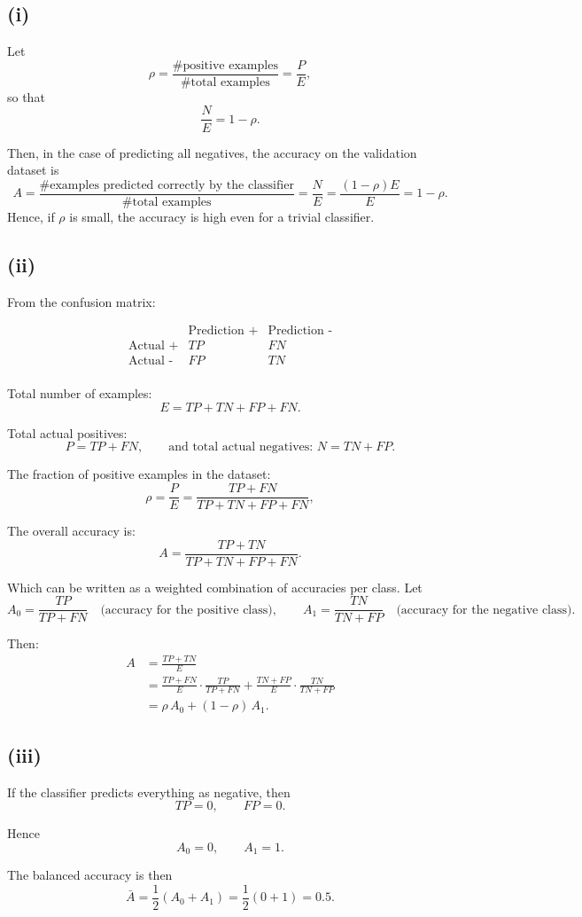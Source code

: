 
\begin{answer}

\subsection*{(i)}
Let
\[
\rho = \frac{\text{\# positive examples}}{\text{\# total examples}} 
      = \frac{P}{E},
\]
so that
\[
\frac{N}{E} = 1 - \rho.
\]

Then, in the case of predicting all negatives,
the accuracy on the validation dataset is
\[
A = \frac{\text{\# examples predicted correctly by the classifier}}{\text{\# total examples}}
  = \frac{N}{E}
  = \frac{(1-\rho)E}{E}
  = 1 - \rho.
\]
Hence, if \(\rho\) is small, the accuracy is high even for a trivial classifier.

\subsection*{(ii)}

From the confusion matrix:

\[
\begin{array}{c|cc}
    & \text{Prediction +} & \text{Prediction -} \\ \hline
    \text{Actual +} & TP & FN \\
    \text{Actual -} & FP & TN \\
\end{array}
\]

Total number of examples:
\[
E = TP + TN + FP + FN.
\]

Total actual positives:
\[
P = TP + FN,
\qquad
\text{and total actual negatives: } N = TN + FP.
\]

The fraction of positive examples in the dataset:
\[
\rho = \frac{P}{E} = \frac{TP + FN}{TP + TN + FP + FN},
\]

The overall accuracy is:
\[
A = \frac{TP + TN}{TP + TN + FP + FN}.
\]

Which can be written as a weighted combination of accuracies per class. Let
\[
A_0 = \frac{TP}{TP + FN} \quad \text{(accuracy for the positive class)},
\qquad
A_1 = \frac{TN}{TN + FP} \quad \text{(accuracy for the negative class)}.
\]

Then:
\[
\begin{aligned}
A &= \frac{TP + TN}{E} \\
  &= \frac{TP + FN}{E} \cdot \frac{TP}{TP + FN}
   + \frac{TN + FP}{E} \cdot \frac{TN}{TN + FP} \\
  &= \rho\, A_0 + (1 - \rho)\, A_1.
\end{aligned}
\]

\subsection*{(iii)}

If the classifier predicts everything as negative, then
\[
TP = 0, \qquad FP = 0.
\]

Hence
\[
A_0 = 0, \qquad A_1 = 1.
\]

The balanced accuracy is then
\[
\bar{A} = \frac{1}{2}(A_0 + A_1)
        = \frac{1}{2}(0 + 1)
        = 0.5.
\]

\end{answer}